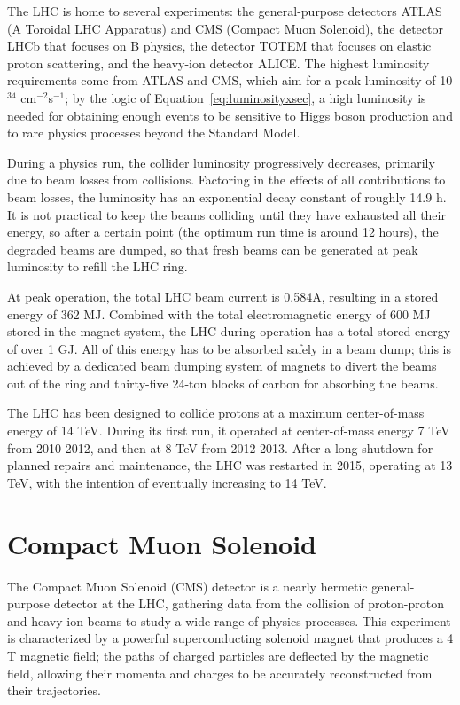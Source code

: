 The LHC is home to several experiments: the general-purpose detectors ATLAS (A Toroidal LHC Apparatus) and CMS (Compact Muon Solenoid), the detector LHCb that focuses on B physics, the detector TOTEM that focuses on elastic proton scattering, and the heavy-ion detector ALICE. The highest luminosity requirements come from ATLAS and CMS, which aim for a peak luminosity of 10$^{34}$ cm$^{-2}$s$^{-1}$; by the logic of Equation~\ref{eq:luminosityxsec}, a high luminosity is needed for obtaining enough events to be sensitive to Higgs boson production and to rare physics processes beyond the Standard Model.

During a physics run, the collider luminosity progressively decreases, primarily due to beam losses from collisions. Factoring in the effects of all contributions to beam losses, the luminosity has an exponential decay constant of roughly 14.9 h. It is not practical to keep the beams colliding until they have exhausted all their energy, so after a certain point (the optimum run time is around 12 hours), the degraded beams are dumped, so that fresh beams can be generated at peak luminosity to refill the LHC ring.

At peak operation, the total LHC beam current is 0.584A, resulting in a stored energy of 362 MJ. Combined with the total electromagnetic energy of 600 MJ stored in the magnet system, the LHC during operation has a total stored energy of over 1 GJ. All of this energy has to be absorbed safely in a beam dump; this is achieved by a dedicated beam dumping system of magnets to divert the beams out of the ring and thirty-five 24-ton blocks of carbon for absorbing the beams.

The LHC has been designed to collide protons at a maximum center-of-mass energy of 14 TeV. During its first run, it operated at center-of-mass energy 7 TeV from 2010-2012, and then at 8 TeV from 2012-2013. After a long shutdown for planned repairs and maintenance, the LHC was restarted in 2015, operating at 13 TeV, with the intention of eventually increasing to 14 TeV.

\section{Compact Muon Solenoid\label{sec:cms}}

The Compact Muon Solenoid (CMS) detector is a nearly hermetic general-purpose detector at the LHC, gathering data from the collision of proton-proton and heavy ion beams to study a wide range of physics processes. This experiment is characterized by a powerful superconducting solenoid magnet that produces a 4 T magnetic field; the paths of charged particles are deflected by the magnetic field, allowing their momenta and charges to be accurately reconstructed from their trajectories.

